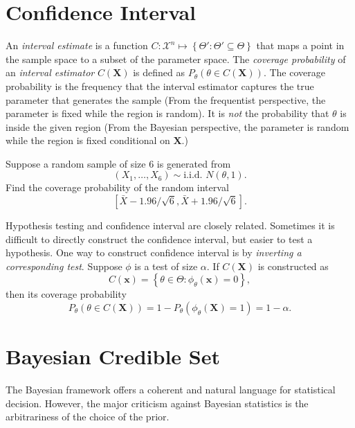 \documentclass[11pt]{article}
\begin{document}
    \section{Confidence Interval}\label{confidence-interval}

An \emph{interval estimate} is a function
\(C:\mathcal{X}^{n}\mapsto\left\{ \Theta':\Theta'\subseteq\Theta\right\}\)
that maps a point in the sample space to a subset of the parameter
space. The \emph{coverage probability} of an \emph{interval estimator}
\(C\left(\mathbf{X}\right)\) is defined as
\(P_{\theta}\left(\theta\in C\left(\mathbf{X}\right)\right)\). The
coverage probability is the frequency that the interval estimator
captures the true parameter that generates the sample (From the
frequentist perspective, the parameter is fixed while the region is
random). It is \emph{not} the probability that \(\theta\) is inside the
given region (From the Bayesian perspective, the parameter is random
while the region is fixed conditional on \(\mathbf{X}\).)

Suppose a random sample of size 6 is generated from
\[\left(X_{1},\ldots,X_{6}\right)\sim\text{i.i.d. }N\left(\theta,1\right).\]
Find the coverage probability of the random interval
\[\left[\bar{X}-1.96/\sqrt{6},\bar{X}+1.96/\sqrt{6}\right].\]

Hypothesis testing and confidence interval are closely related.
Sometimes it is difficult to directly construct the confidence interval,
but easier to test a hypothesis. One way to construct confidence
interval is by \emph{inverting a corresponding test}. Suppose \(\phi\)
is a test of size \(\alpha\). If \(C\left(\mathbf{X}\right)\) is
constructed as
\[C\left(\mathbf{x}\right)=\left\{ \theta\in\Theta:\phi_{\theta}\left(\mathbf{x}\right)=0\right\},\]
then its coverage probability
\[P_{\theta}\left(\theta\in C\left(\mathbf{X}\right)\right)=1-P_{\theta}\left(\phi_{\theta}\left(\mathbf{X}\right)=1\right)=1-\alpha.\]





\section{Bayesian Credible Set}



The Bayesian framework offers a coherent and natural language for statistical decision.
However, the major criticism against Bayesian statistics is the arbitrariness of the choice
of the prior. 
\end{document}
